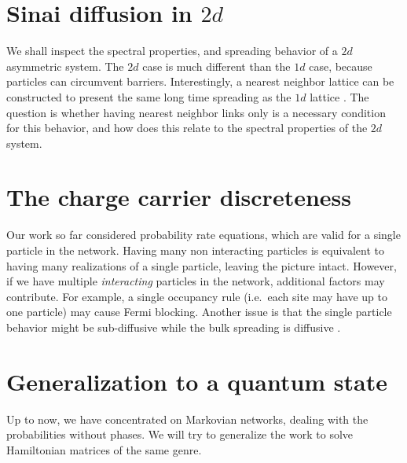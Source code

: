 \section{Sinai diffusion in $2d$}

We shall inspect the spectral properties, and spreading behavior of a $2d$ asymmetric system. The
$2d$ case is much different than the $1d$ case, because particles can circumvent barriers. Interestingly,
a nearest neighbor lattice can be constructed to present the same long time spreading as the $1d$ lattice \cite{blumberg_selinger_diffusion_1989}.
The question is whether having nearest neighbor links only is a necessary condition for this behavior,
and how does this relate to the spectral properties of the $2d$ system.


\section{The charge carrier discreteness}\label{sec:discreteness}

Our work so far considered probability rate equations, which are valid for a single particle in the network.
Having many non interacting particles is equivalent to having many realizations of a single particle,
leaving the picture intact. However, if we have multiple \emph{interacting} particles in the network, additional factors may contribute. For example,
a single occupancy rule (i.e.\ each site may have up to one particle) may cause Fermi blocking. Another
issue is that the single particle behavior might be sub-diffusive while the bulk spreading is diffusive \cite{richards_theory_1977,hung_diffusion_2012}.


\section{Generalization to a quantum state}

Up to now, we have concentrated on Markovian networks, dealing with the probabilities without phases.
We will try to generalize the work to solve Hamiltonian matrices of the same genre.




